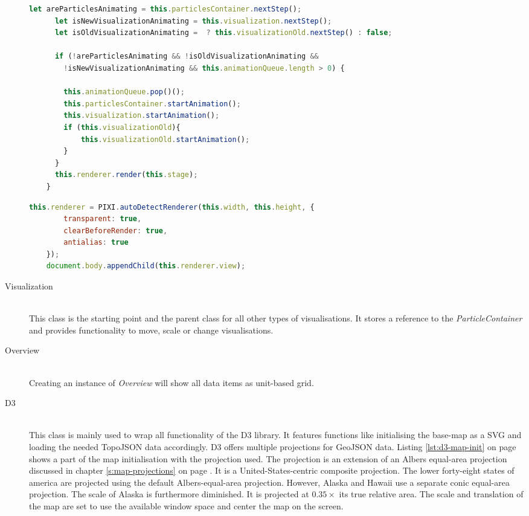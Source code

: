 \begin{description}
\begin{lstlisting}[language=JavaScript, caption={Render function of the canvas class.}, label={lst:canvas-render}]
      let areParticlesAnimating = this.particlesContainer.nextStep();
      let isNewVisualizationAnimating = this.visualization.nextStep();
      let isOldVisualizationAnimating =  ? this.visualizationOld.nextStep() : false;

      if (!areParticlesAnimating && !isOldVisualizationAnimating &&
        !isNewVisualizationAnimating && this.animationQueue.length > 0) {

        this.animationQueue.pop()();
        this.particlesContainer.startAnimation();
        this.visualization.startAnimation();
        if (this.visualizationOld){
            this.visualizationOld.startAnimation();
        }
      }
      this.renderer.render(this.stage);
    }
\end{lstlisting}

\begin{lstlisting}[language=JavaScript, caption={Pixi's autodetect-renderer.}, label={lst:canvas-autodecet-renderer}]
    this.renderer = PIXI.autoDetectRenderer(this.width, this.height, {
        transparent: true,
        clearBeforeRender: true,
        antialias: true
    });
    document.body.appendChild(this.renderer.view);
\end{lstlisting}

\item[Visualization] \hfill \\
This class is the starting point and the parent class for all other types of visualisations. It stores a reference to the \textit{ParticleContainer} and provides functionality to move, scale or change visualisations.

\item[Overview] \hfill \\
Creating an instance of \textit{Overview} will show all data items as unit-based grid.

\item[D3] \hfill \\
This class is mainly used to wrap all functionality of the \ac{D3} library. It features functions like initialising the base-map as a \ac{SVG} and loading the needed TopoJSON data accordingly. \ac{D3} offers multiple projections for GeoJSON data. Listing \ref{lst:d3-map-init} on page \pageref{lst:d3-map-init} shows a part of the map initialisation with the projection used. The projection is an extension of an Albers equal-area projection discussed in chapter \ref{s:map-projections} on page \pageref{s:albers-equal-area-projection}. It is a United-States-centric composite projection. The lower forty-eight states of america are projected using the default Albers-equal-area projection. However, Alaska and Hawaii use a separate conic equal-area projection. The scale of Alaska is furthermore diminished. It is projected at $0.35\times$ its true relative area. The scale and translation of the map are set to use the available window space and center the map on the screen.


\end{description}
